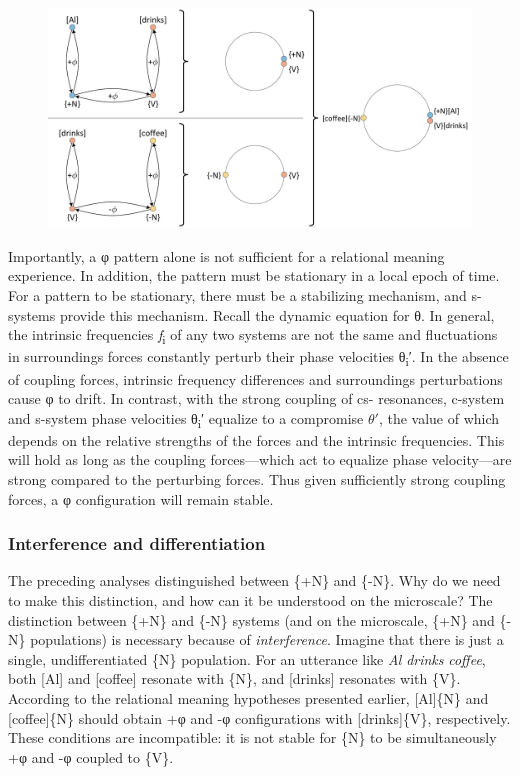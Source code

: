   
\begin{figure}
\includegraphics[width=\textwidth]{figures/Tilsen-img22.png}
\caption{\missingcaption}
\label{fig:}
\end{figure}
 

  Importantly, a φ pattern alone is not sufficient for a relational meaning experience. In addition, the pattern must be stationary in a local epoch of time. For a pattern to be stationary, there must be a stabilizing mechanism, and s-systems provide this mechanism. Recall the dynamic equation for θ. In general, the intrinsic frequencies \textit{f}\textsubscript{i} of any two systems are not the same and fluctuations in surroundings forces constantly perturb their phase velocities θ\textsubscript{i}′. In the absence of coupling forces, intrinsic frequency differences and surroundings perturbations cause φ to drift. In contrast, with the strong coupling of cs- resonances, c-system and s-system phase velocities θ\textsubscript{i}′ equalize to a compromise $\theta ′$, the value of which depends on the relative strengths of the forces and the intrinsic frequencies. This will hold as long as the coupling forces—which act to equalize phase velocity—are strong compared to the perturbing forces. Thus given sufficiently strong coupling forces, a φ configuration will remain stable.

\subsubsection{Interference and differentiation}

The preceding analyses distinguished between \{+N\} and \{-N\}. Why do we need to make this distinction, and how can it be understood on the microscale? The distinction between \{+N\} and \{-N\} systems (and on the microscale, \{+N\} and \{-N\} populations) is necessary because of \textit{interference}. Imagine that there is just a single, undifferentiated \{N\} population. For an utterance like \textit{Al} \textit{drinks} \textit{coffee}, both [Al] and [coffee] resonate with \{N\}, and [drinks] resonates with \{V\}. According to the relational meaning hypotheses presented earlier, [Al]\{N\} and [coffee]\{N\} should obtain +φ and -φ configurations with [drinks]\{V\}, respectively. These conditions are incompatible: it is not stable for \{N\} to be simultaneously +φ and -φ coupled to \{V\}.

